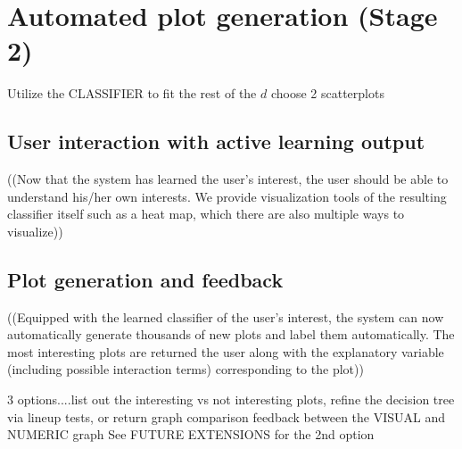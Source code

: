 \section{Automated plot generation (Stage 2)}
\label{sec:visualizer:plotgeneration}

Utilize the CLASSIFIER to fit the rest of the $d$ choose 2 scatterplots

\subsection{User interaction with active learning output}
\label{sec:visualizer:plotgeneration:user}

((Now that the system has learned the user’s interest, the user should be able
to understand his/her own interests. We provide visualization tools of the
resulting classifier itself such as a heat map, which there are also multiple
ways to visualize))

\subsection{Plot generation and feedback}
\label{sec:visualizer:plotgeneration:feedback}

((Equipped with the learned classifier of the user’s interest, the system can
now automatically generate thousands of new plots and label them automatically.
The most interesting plots are returned the user along with the explanatory
variable (including possible interaction terms) corresponding to the plot))

3 options....list out the interesting vs not interesting plots, refine the
decision tree via lineup tests, or return graph comparison feedback between the
VISUAL and NUMERIC graph
See FUTURE EXTENSIONS for the 2nd option
